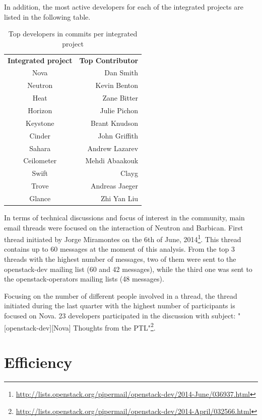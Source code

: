 \documentclass[a4wide,11pt]{report}
\begin{document}
In addition, the most active developers for each of the integrated projects are listed in the following table.


\begin{table}[H]
\centering
\begin{tabular}{c|r|} 
\textbf{Integrated project} & \textbf{Top Contributor} \\
Nova & Dan Smith\\
Neutron & Kevin Benton\\
Heat & Zane Bitter\\
Horizon & Julie Pichon\\
Keystone & Brant Knudson\\
Cinder & John Griffith\\
Sahara & Andrew Lazarev\\
Ceilometer & Mehdi Abaakouk\\
Swift & Clayg\\
Trove & Andreas Jaeger\\
Glance & Zhi Yan Liu\\
\end{tabular}
\caption{Top developers in commits per integrated project}
\end{table}


In terms of technical discussions and focus of interest in the community, main email threads were 
focused on the interaction of Neutron and Barbican. First thread initiated by Jorge Miramontes on the 6th of June,  2014\footnote{\url{http://lists.openstack.org/pipermail/openstack-dev/2014-June/036937.html}}. This thread contains up
to 60 messages at the moment of this analysis. From the top 3 threads with the highest number of messages, two of them were
sent to the openstack-dev mailing list (60 and 42 messages), while the third one was sent to the openstack-operators mailing lists (48 messages).

Focusing on the number of different people involved in a thread, the thread initiated during the last quarter
with the highest number of participants is focused on Nova. 23 developers participated in the discussion with subject: "[openstack-dev][Nova] Thoughts from the PTL"\footnote{\url{http://lists.openstack.org/pipermail/openstack-dev/2014-April/032566.html}}. 


\section{Efficiency}
\end{document}
